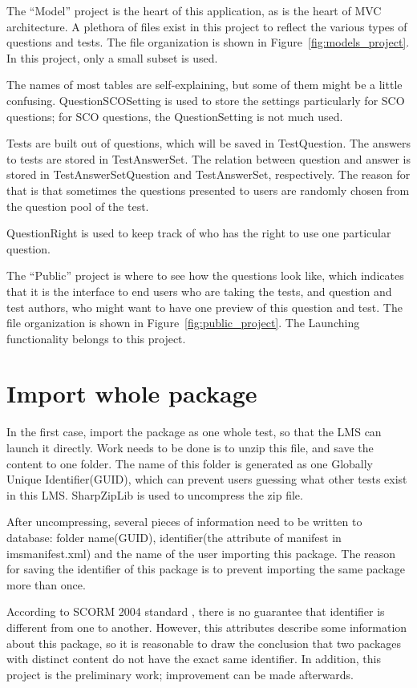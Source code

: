 The ``Model'' project is the heart of this application, as is the heart of MVC architecture. A plethora of files exist in this project to reflect the 
various types of questions and tests. The file organization is shown in Figure~\ref{fig:models_project}. In this project, only a small subset is 
used.

The names of most tables are self-explaining, but some of them might be a little confusing.
QuestionSCOSetting is used to store the settings particularly for SCO questions; for SCO questions, the QuestionSetting is not much used. 

Tests are built out of questions, which will be saved in TestQuestion. The answers to tests are stored in TestAnswerSet. The relation between 
question and answer is stored in TestAnswerSetQuestion and TestAnswerSet, respectively. The reason for that is that sometimes the questions presented 
to users are randomly chosen from the question pool of the test.

QuestionRight is used to keep track of who has the right to use one particular question.

The ``Public'' project is where to see how the questions look like, which indicates that it is the interface to end users who are taking the tests, 
and question and test authors, who might want to have one preview of this question and test. The file organization is shown in 
Figure~\ref{fig:public_project}. The Launching functionality belongs to this project.
\section{Import whole package}
In the first case, import the package as one whole test, so that the LMS can launch it directly. Work needs to be done is to unzip this file,
and save the content to one folder. The name of this folder is generated as one Globally Unique Identifier(GUID), which can prevent users guessing 
what other tests exist in this LMS. SharpZipLib \cite{sharpziplib} is used to uncompress the zip file.

After uncompressing, several pieces of information need to be written to database: folder name(GUID), identifier(the attribute of manifest in 
imsmanifest.xml) and the name of the user importing this package. The reason for saving the identifier of this package is to prevent importing the
same package more than once.

According to SCORM 2004 standard \cite{cambook}, there is no guarantee that identifier is different from one to another. However, this attributes 
describe some information about this package, so it is reasonable to draw the conclusion that two packages with distinct content do not have the exact
same identifier. In addition, this project is the preliminary work; improvement can be made afterwards.


